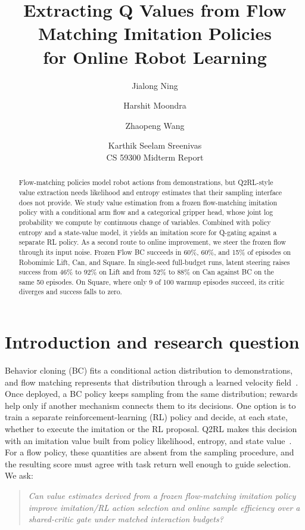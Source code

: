 \documentclass[10pt]{article}
\title{\textbf{Extracting Q Values from Flow Matching Imitation Policies\\for Online Robot Learning}}
\author{Jialong Ning \and Harshit Moondra \and Zhaopeng Wang \and Karthik Seelam Sreenivas\\[4pt]
\normalsize CS 59300 Midterm Report}
\date{}
\begin{document}
\maketitle

\begin{abstract}
Flow-matching policies model robot actions from demonstrations, but Q2RL-style
value extraction needs likelihood and entropy estimates that their sampling
interface does not provide. We study value estimation from a frozen
flow-matching imitation policy with a conditional arm flow and a categorical
gripper head, whose joint log probability we compute by continuous change of
variables. Combined with policy entropy and a state-value model, it yields an
imitation score for Q-gating against a separate RL policy. As a second route to
online improvement, we steer the frozen flow through its input noise. Frozen
Flow BC succeeds in 60\%, 60\%, and 15\% of episodes on Robomimic Lift, Can, and
Square. In single-seed full-budget runs, latent steering raises success from
46\% to 92\% on Lift and from 52\% to 88\% on Can against BC on the same 50
episodes. On Square, where only 9 of 100 warmup episodes succeed, its critic
diverges and success falls to zero.
\end{abstract}

\section{Introduction and research question}

Behavior cloning (BC) fits a conditional action distribution to demonstrations,
and flow matching represents that distribution through a learned velocity
field~\cite{lipman2022flow}. Once deployed, a BC policy keeps sampling from the
same distribution; rewards help only if another mechanism connects them to its
decisions. One option is to train a separate reinforcement-learning (RL) policy
and decide, at each state, whether to execute the imitation or the RL proposal.
Q2RL makes this decision with an imitation value built from policy likelihood,
entropy, and state value~\cite{dodeja2026q2rl}. For a flow policy, these
quantities are absent from the sampling procedure, and the resulting score must
agree with task return well enough to guide selection. We ask:

\begin{quote}\centering\itshape
Can value estimates derived from a frozen flow-matching imitation policy improve
imitation/RL action selection and online sample efficiency over a shared-critic
gate under matched interaction budgets?
\end{quote}
\end{document}
